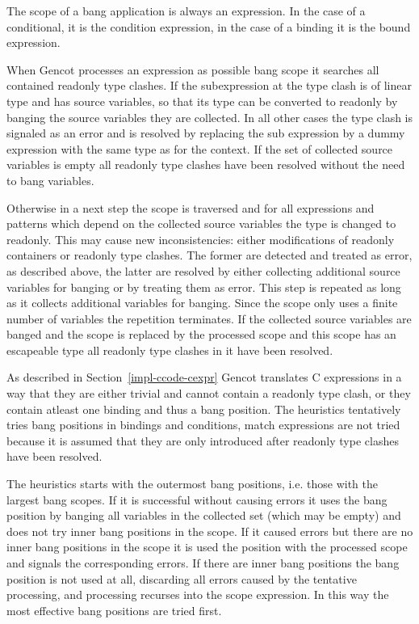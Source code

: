 The scope of a bang application is always an expression. In the case of a conditional, it is the condition expression, in the
case of a binding it is the bound expression.

When Gencot processes an expression as possible bang scope it searches all
contained readonly type clashes. If the subexpression at the type clash is of linear type and has source variables, so that
its type can be converted to readonly by banging the source variables they are collected. In all other cases the type clash
is signaled as an error and is resolved by replacing the sub expression by a dummy expression with the same type as for the
context. If the set of collected source variables is empty all readonly type clashes have been resolved without the need to
bang variables.

Otherwise in a next step the scope is traversed and for all expressions and patterns which depend on the collected source
variables the type is changed to readonly. This may cause new inconsistencies: either modifications of readonly containers
or readonly type clashes. The former are detected and treated as error, as described above, the latter are resolved by either
collecting additional source variables for banging or by treating them as error. This step is repeated as long as it collects
additional variables for banging. Since the scope only uses a finite number of variables the repetition terminates. If the
collected source variables are banged and the scope is replaced by the processed scope and this scope has an escapeable type
all readonly type clashes in it have been resolved.

As described in Section~\ref{impl-ccode-cexpr} Gencot translates C expressions in a way that they are either trivial and cannot
contain a readonly type clash, or they contain atleast one binding and thus a bang position. The heuristics tentatively tries
bang positions in bindings and conditions, match expressions are not tried because it is assumed that they are only introduced
after readonly type clashes have been resolved.

The heuristics starts with the outermost bang positions, i.e. those with the largest bang scopes. If it is successful without
causing errors it uses the bang position by banging all variables in the collected set (which may be empty) and does not try
inner bang positions in the scope. If it caused errors but there are no inner bang positions in the scope it is used the
position with the processed scope and signals the corresponding errors. If there are inner bang positions the bang position
is not used at all, discarding all errors caused by the tentative processing, and processing recurses into the scope expression.
In this way the most effective bang positions are tried first.

